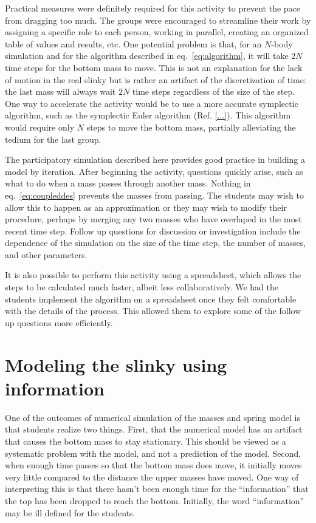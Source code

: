 \documentclass[aps,pre,10pt,superscriptaddress,showpacs,amsmath,amssymb,nofootinbib]{revtex4-1}
\newcommand{\eq}[1]{eq.~\eqref{eq:#1}}
\begin{document}
Practical measures were definitely required for this activity to prevent the pace from dragging
too much. The groups were encouraged to streamline their work by assigning a specific
role to each person, working in parallel, creating an organized table of values and results,
etc. One potential problem is that, for an $N$-body simulation and for the algorithm described in \eq{algorithm},
it will take $2N$ time steps for the bottom mass to move. This is not an explanation for
the lack of motion in the real slinky but is rather an artifact of the discretization of time:
the last mass will always wait $2N$ time steps regardless of the size of the step. One way to
accelerate the activity would be to use a more accurate symplectic algorithm, such as the
symplectic Euler algorithm (Ref. \ref{...}). This algorithm would require only $N$ steps to move the bottom
mass, partially alleviating the tedium for the last group.

The participatory simulation described here provides good practice in building
a model by iteration. After beginning the activity, questions quickly arise, such
as what to do when a mass passes through another mass. Nothing in \eq{coupleddes} prevents
the masses from passing. The students may wish to allow this to happen as an approximation
or they may wish to modify their procedure, perhaps by merging any two masses who have overlaped
in the most recent time step. Follow up questions for discussion or investigation include
the dependence of the simulation on the size of the time step, the number of masses,
and other parameters.

It is also possible to perform this activity using a spreadsheet, which allows the steps to be
calculated much faster, albeit less collaboratively. We had the students implement the algorithm on a spreadsheet once they
felt comfortable with the details of the process. This allowed them to explore some of the follow
up questions more efficiently.

\section{Modeling the slinky using information}
\label{sec:information}

One of the outcomes of numerical simulation of the masses and spring model is that students realize
two things. First, that the numerical model has an artifact that causes the bottom mass to stay stationary.
This should be viewed as a systematic problem with the model, and not a prediction of the model.
Second, when enough time passes so that the bottom mass does move, it initially moves very little compared 
to the distance the upper masses have moved. One way of interpreting this is that there hasn't been enough
time for the ``information'' that the top has been dropped to reach the bottom. Initially, the word ``information''
may be ill defined for the students.
\end{document}
